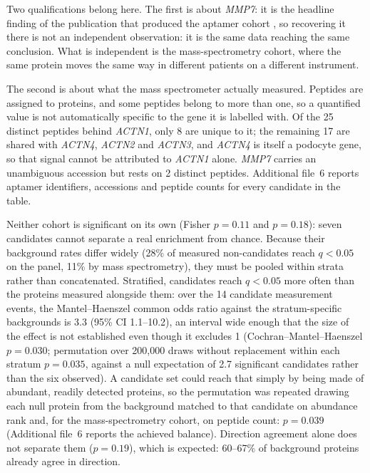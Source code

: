 \documentclass[pdflatex,sn-vancouver-num]{sn-jnl}
\theoremstyle{thmstyleone}
\theoremstyle{thmstyletwo}
\theoremstyle{thmstylethree}
\begin{document}
Two qualifications belong here. The first is about \textit{MMP7}: it is the headline finding
of the publication that produced the aptamer cohort \cite{hirohama2023}, so recovering it there
is not an independent observation: it is the same data reaching the same conclusion. What is
independent is the mass-spectrometry cohort, where the same protein moves the same way in
different patients on a different instrument.

The second is about what the mass spectrometer actually measured. Peptides are assigned to
proteins, and some peptides belong to more than one, so a quantified value is not automatically
specific to the gene it is labelled with. Of the 25 distinct peptides behind \textit{ACTN1},
only 8 are unique to it; the remaining 17 are shared with \textit{ACTN4}, \textit{ACTN2} and
\textit{ACTN3}, and \textit{ACTN4} is itself a podocyte gene, so that signal cannot be attributed to
\textit{ACTN1} alone. \textit{MMP7} carries an unambiguous accession but rests on 2 distinct
peptides. Additional file~6 reports aptamer identifiers, accessions and peptide counts for
every candidate in the table.

Neither cohort is significant on its own (Fisher $p = 0.11$ and $p = 0.18$): seven candidates
cannot separate a real enrichment from chance. Because their background rates differ widely
(28\% of measured non-candidates reach $q < 0.05$ on the panel, 11\% by mass spectrometry), they
must be pooled within strata rather than concatenated. Stratified, candidates reach $q < 0.05$
more often than the proteins measured alongside them: over the 14 candidate measurement
events, the Mantel--Haenszel common odds ratio against the stratum-specific backgrounds
is 3.3 (95\% CI 1.1--10.2), an interval wide enough that the size of the effect is not
established even though it excludes 1 (Cochran--Mantel--Haenszel \cite{mantel1959} $p = 0.030$;
permutation over 200,000 draws without replacement within each stratum $p = 0.035$,
against a null expectation of 2.7 significant candidates rather than the six observed). A
candidate set could reach that simply by being made of abundant, readily detected proteins, so
the permutation was repeated drawing each null protein from the background matched to that
candidate on abundance rank and, for the mass-spectrometry cohort, on peptide count: $p = 0.039$
(Additional file~6 reports the achieved balance). Direction agreement alone does not separate them
($p = 0.19$), which is expected: 60--67\% of background proteins already agree in direction.
\end{document}
